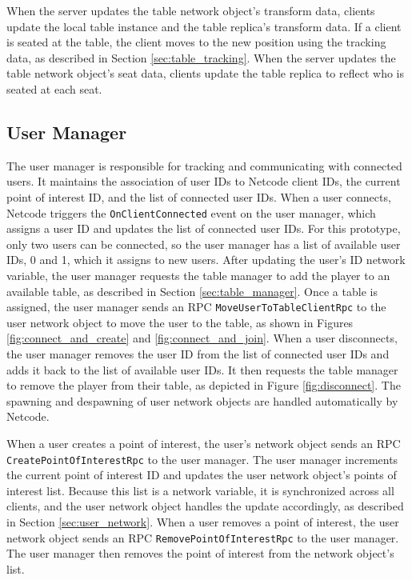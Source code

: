         When the server updates the table network object's transform data, clients update the local table instance and the table replica's transform data. If a client is seated at the table, the client moves to the new position using the tracking data, as described in Section \ref{sec:table_tracking}. When the server updates the table network object's seat data, clients update the table replica to reflect who is seated at each seat.

    \subsection{User Manager} \label{sec:user_manager}
    
        The user manager is responsible for tracking and communicating with connected users. It maintains the association of user IDs to Netcode client IDs, the current point of interest ID, and the list of connected user IDs. When a user connects, Netcode triggers the \lstinline{OnClientConnected} event on the user manager, which assigns a user ID and updates the list of connected user IDs. For this prototype, only two users can be connected, so the user manager has a list of available user IDs, 0 and 1, which it assigns to new users. After updating the user's ID network variable, the user manager requests the table manager to add the player to an available table, as described in Section \ref{sec:table_manager}. Once a table is assigned, the user manager sends an RPC \lstinline{MoveUserToTableClientRpc} to the user network object to move the user to the table, as shown in Figures \ref{fig:connect_and_create} and \ref{fig:connect_and_join}. When a user disconnects, the user manager removes the user ID from the list of connected user IDs and adds it back to the list of available user IDs. It then requests the table manager to remove the player from their table, as depicted in Figure \ref{fig:disconnect}. The spawning and despawning of user network objects are handled automatically by Netcode.

        When a user creates a point of interest, the user's network object sends an RPC \lstinline{CreatePointOfInterestRpc} to the user manager. The user manager increments the current point of interest ID and updates the user network object's points of interest list. Because this list is a network variable, it is synchronized across all clients, and the user network object handles the update accordingly, as described in Section \ref{sec:user_network}. When a user removes a point of interest, the user network object sends an RPC \lstinline{RemovePointOfInterestRpc} to the user manager. The user manager then removes the point of interest from the network object's list.
        
